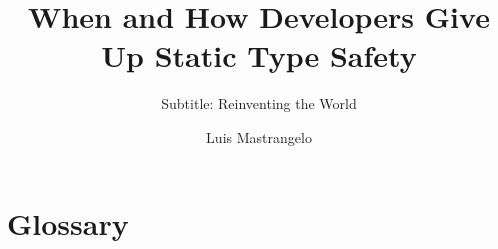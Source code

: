 \documentclass[]{usiinfthesis}
\title{When and How \lang{Java} Developers Give Up Static Type Safety} %
\subtitle{Subtitle: Reinventing the World} %
\author{Luis Mastrangelo} %
\begin{document}

\maketitle %
\frontmatter %




\tableofcontents 
\listoffigures %
\listoftables %

\mainmatter







\appendix %



\backmatter

\chapter{Glossary} %

\else

\fi




\end{document}
